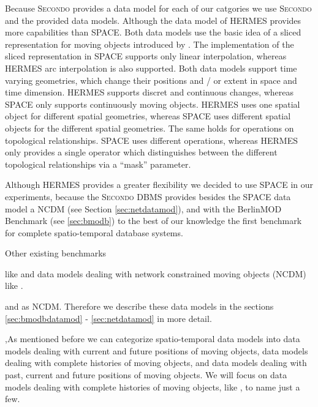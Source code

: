 \documentclass[a4paper]{article}
\newcommand{\secondo}{\textsc{Secondo}}
\newcommand{\bmodb} {BerlinMOD Benchmark}
\begin{document}
Because \secondo{} provides a data model for each of our catgories we use \secondo{}
and the provided data models. Although the data model of HERMES provides more
capabilities than SPACE.
Both data models use the basic idea of a sliced representation for moving objects
introduced by \cite{RepresentingMovingObjectsGueting,DataModelDataStructureGueting}.
The implementation of the sliced representation in SPACE supports only linear
interpolation, whereas HERMES arc interpolation is also supported. Both data
models support time varying geometries, which change their positions and / or
extent in space and time dimension. HERMES supports discret and continuous
changes, whereas SPACE only supports continuously moving objects. HERMES uses
one spatial object for different spatial geometries, whereas SPACE
uses different spatial objects for the different spatial geometries.
The same holds for operations on topological relationships. SPACE
uses different operations, whereas HERMES only provides a single operator which
distinguishes between the different topological relationships via a ``mask'' parameter.

Although HERMES provides a greater flexibility we decided to use SPACE in our
experiments, because the \secondo{} DBMS provides besides
the SPACE data model a NCDM \cite{NetworkGueting} (see Section \ref{sec:netdatamod}),
and with the \bmodb{} \cite{BMODBVLDBDuentgen} (see \ref{sec:bmodb})
to the best of our knowledge the first benchmark for complete spatio-temporal
database systems.




Other existing benchmarks \cite{COSTBenchmarkJensen,QueriesTheodoridis}


like \cite{RepresentingMovingObjectsGueting,DataModelDataStructureGueting,STAUPelekis,HERMESMDCPelekis}
and data models dealing with network constrained moving objects (NCDM) like \cite{NetworkGueting,NetworkJensen,NetworkVazirgiannis,DynamicTransportationNetworkDing}.

and \cite{NetworkGueting} as NCDM. Therefore we describe these data models
in the sections \ref{sec:bmodbdatamod} - \ref{sec:netdatamod} in more detail.


\cite{RepresentingMovingObjectsGueting,DataModelDataStructureGueting,NetworkGueting,NetworkJensen,NetworkVazirgiannis,DynamicTransportationNetworkDing},As mentioned before we can categorize spatio-temporal data models into
data models dealing with current and future positions of moving objects,
data models dealing with complete histories of moving objects, and data models
dealing with past, current and future positions of moving objects. We will focus
on data models dealing with complete histories of moving objects, like \cite{STAUPelekis,HERMESMDCPelekis,RepresentingMovingObjectsGueting,DataModelDataStructureGueting,NetworkGueting,NetworkJensen,NetworkVazirgiannis,DynamicTransportationNetworkDing}, to name just a few.
\end{document}

